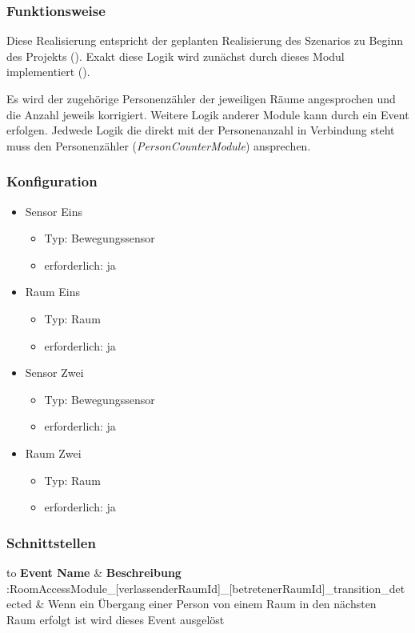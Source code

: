 \subsubsection{Funktionsweise}
Diese Realisierung entspricht der geplanten Realisierung des Szenarios zu Beginn des Projekts (). Exakt diese Logik wird zunächst durch dieses Modul implementiert ().

Es wird der zugehörige Personenzähler der jeweiligen Räume angesprochen und die Anzahl jeweils korrigiert. Weitere Logik anderer Module kann durch ein Event erfolgen. Jedwede Logik die direkt mit der Personenanzahl in Verbindung steht muss den Personenzähler (\emph{PersonCounterModule}) ansprechen.

\subsubsection{Konfiguration}
\begin{itemize}
	\item Sensor Eins
	\begin{itemize}
		\item Typ: Bewegungssensor
		\item erforderlich: ja
	\end{itemize}
	
	\item Raum Eins
	\begin{itemize}
		\item Typ: Raum
		\item erforderlich: ja
	\end{itemize}

	\item Sensor Zwei
	\begin{itemize}
		\item Typ: Bewegungssensor
		\item erforderlich: ja
	\end{itemize}
	
	\item Raum Zwei
	\begin{itemize}
		\item Typ: Raum
		\item erforderlich: ja
	\end{itemize}
\end{itemize}

\subsubsection{Schnittstellen}
\begin{longtabu} to 
		\hline
		\textbf{Event Name}						& \textbf{Beschreibung} \\
	\hline
	\endhead
		\hline [DeviceId]:RoomAccessModule\_[verlassenderRaumId]\_[betretenerRaumId]\_transition\_detected	& Wenn ein Übergang einer Person von einem Raum in den nächsten 	Raum erfolgt ist wird dieses Event ausgelöst \\ 
		\hline
	\caption{\emph{RoomAccessModule}: Schnittstellen Event Bus}
\end{longtabu}

